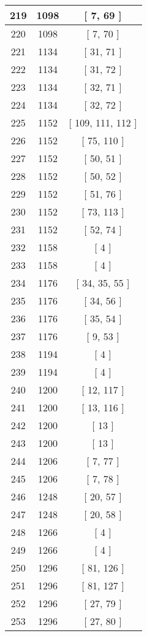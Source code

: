 \begin{center}
\begin{longtable}[H]{|| c c c ||}
\hline
219 & 1098 & [ 7, 69 ] \\ 
\hline
220 & 1098 & [ 7, 70 ] \\ 
\hline
221 & 1134 & [ 31, 71 ] \\ 
\hline
222 & 1134 & [ 31, 72 ] \\ 
\hline
223 & 1134 & [ 32, 71 ] \\ 
\hline
224 & 1134 & [ 32, 72 ] \\ 
\hline
225 & 1152 & [ 109, 111, 112 ] \\ 
\hline
226 & 1152 & [ 75, 110 ] \\ 
\hline
227 & 1152 & [ 50, 51 ] \\ 
\hline
228 & 1152 & [ 50, 52 ] \\ 
\hline
229 & 1152 & [ 51, 76 ] \\ 
\hline
230 & 1152 & [ 73, 113 ] \\ 
\hline
231 & 1152 & [ 52, 74 ] \\ 
\hline
232 & 1158 & [ 4 ] \\ 
\hline
233 & 1158 & [ 4 ] \\ 
\hline
234 & 1176 & [ 34, 35, 55 ] \\ 
\hline
235 & 1176 & [ 34, 56 ] \\ 
\hline
236 & 1176 & [ 35, 54 ] \\ 
\hline
237 & 1176 & [ 9, 53 ] \\ 
\hline
238 & 1194 & [ 4 ] \\ 
\hline
239 & 1194 & [ 4 ] \\ 
\hline
240 & 1200 & [ 12, 117 ] \\ 
\hline
241 & 1200 & [ 13, 116 ] \\ 
\hline
242 & 1200 & [ 13 ] \\ 
\hline
243 & 1200 & [ 13 ] \\ 
\hline
244 & 1206 & [ 7, 77 ] \\ 
\hline
245 & 1206 & [ 7, 78 ] \\ 
\hline
246 & 1248 & [ 20, 57 ] \\ 
\hline
247 & 1248 & [ 20, 58 ] \\ 
\hline
248 & 1266 & [ 4 ] \\ 
\hline
249 & 1266 & [ 4 ] \\ 
\hline
250 & 1296 & [ 81, 126 ] \\ 
\hline
251 & 1296 & [ 81, 127 ] \\ 
\hline
252 & 1296 & [ 27, 79 ] \\ 
\hline
253 & 1296 & [ 27, 80 ] \\ 
\hline

\end{longtable}
\end{center}
